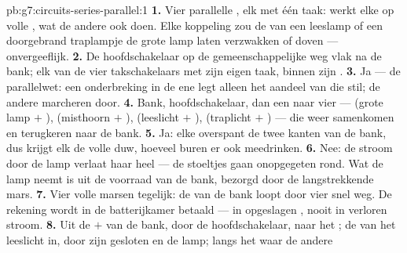 \begin{solution}{pb:g7:circuits-series-parallel:1}
\textbf{1.} Vier parallelle , elk met één taak:
 werkt elke  op volle , wat de andere ook doen.
Elke koppeling  zou de  van een leeslamp of een
doorgebrand traplampje de grote lamp laten verzwakken of doven ---
onvergeeflijk.
\textbf{2.} De hoofdschakelaar op de gemeenschappelijke weg vlak na de
bank; elk van de vier takschakelaars  met zijn eigen
taak, binnen zijn .
\textbf{3.} Ja --- de parallelwet: een onderbreking in de ene
 legt alleen het aandeel van die  stil; de andere
marcheren door.
\textbf{4.} Bank, hoofdschakelaar, dan een  naar vier
 --- (grote lamp $+$ ), (misthoorn $+$
), (leeslicht $+$ ), (traplicht $+$
) --- die weer samenkomen en terugkeren naar de bank.
\textbf{5.} Ja: elke  overspant de twee kanten van de bank, dus
krijgt elk de volle duw, hoeveel buren er ook meedrinken.
\textbf{6.} Nee: de stroom door de lamp verlaat haar heel --- de
stoeltjes gaan onopgegeten rond. Wat de lamp neemt is  uit de
voorraad van de bank, bezorgd door de langstrekkende mars.
\textbf{7.} Vier volle marsen tegelijk: de  van de bank loopt
door vier  snel weg. De rekening wordt in de batterijkamer
betaald --- in opgeslagen , nooit in verloren stroom.
\textbf{8.} Uit de $+$ van de bank, door de hoofdschakelaar, naar
het ; de  van het leeslicht in, door zijn
gesloten  en de lamp; langs het  waar de andere

\end{solution}
